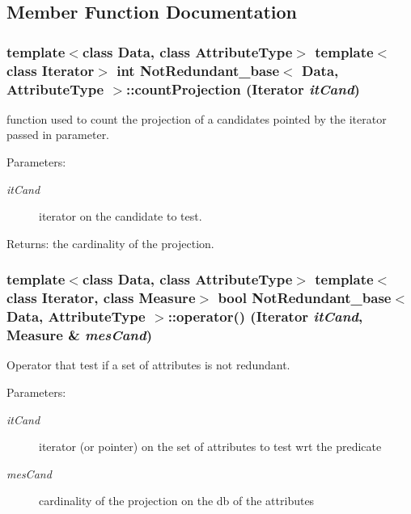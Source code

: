 \subsection{Member Function Documentation}
\subsubsection{\setlength{\rightskip}{0pt plus 5cm}template$<$class Data, class Attribute\-Type$>$ template$<$class Iterator$>$ int {\bf Not\-Redundant\_\-base}$<$ Data, Attribute\-Type $>$::count\-Projection (Iterator {\em it\-Cand})\hspace{0.3cm}{\tt  [protected]}}\label{class_not_redundant__base_4197a9ab9226918dba7ad6d155c9cc82}


function used to count the projection of a candidates pointed by the iterator passed in parameter. 

\begin{Desc}
\item[Parameters:]
\begin{description}
\item[{\em it\-Cand}]iterator on the candidate to test. \end{description}
\end{Desc}
\begin{Desc}
\item[Returns:]the cardinality of the projection. \end{Desc}
\subsubsection{\setlength{\rightskip}{0pt plus 5cm}template$<$class Data, class Attribute\-Type$>$ template$<$class Iterator, class Measure$>$ bool {\bf Not\-Redundant\_\-base}$<$ Data, Attribute\-Type $>$::operator() (Iterator {\em it\-Cand}, Measure \& {\em mes\-Cand})}\label{class_not_redundant__base_8a2f2747d1462b78140eef2a0c302d67}


Operator that test if a set of attributes is not redundant. 

\begin{Desc}
\item[Parameters:]
\begin{description}
\item[{\em it\-Cand}]iterator (or pointer) on the set of attributes to test wrt the predicate \item[{\em mes\-Cand}]cardinality of the projection on the db of the attributes \end{description}
\end{Desc}


